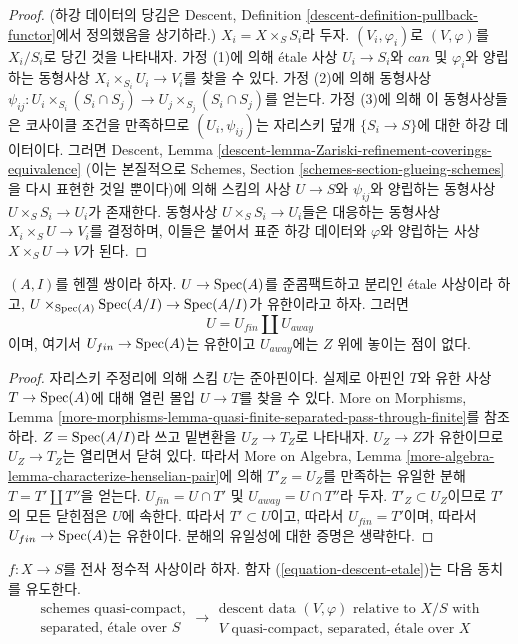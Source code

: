 \begin{proof}
(하강 데이터의 당김은 Descent, Definition
\ref{descent-definition-pullback-functor}에서 정의했음을 상기하라.)
$X_i = X \times_S S_i$라 두자. $(V_i, \varphi_i)$로
$(V, \varphi)$를 $X_i/S_i$로 당긴 것을 나타내자.
가정 (1)에 의해 \'etale 사상 $U_i \to S_i$와
$can$ 및 $\varphi_i$와 양립하는 동형사상
$X_i \times_{S_i} U_i \to V_i$를 찾을 수 있다.
가정 (2)에 의해 동형사상
$\psi_{ij} : U_i \times_{S_i} (S_i \cap S_j) \to
U_j \times_{S_j} (S_i \cap S_j)$를 얻는다.
가정 (3)에 의해 이 동형사상들은 코사이클 조건을 만족하므로
$(U_i, \psi_{ij})$는 자리스키 덮개 $\{S_i \to S\}$에 대한
하강 데이터이다. 그러면 Descent, Lemma
\ref{descent-lemma-Zariski-refinement-coverings-equivalence}
(이는 본질적으로 Schemes, Section
\ref{schemes-section-glueing-schemes}을 다시 표현한 것일 뿐이다)에 의해
스킴의 사상 $U \to S$와 $\psi_{ij}$와 양립하는 동형사상
$U \times_S S_i \to U_i$가 존재한다.
동형사상 $U \times_S S_i \to U_i$들은 대응하는 동형사상
$X_i \times_S U \to V_i$를 결정하며, 이들은 붙어서 표준 하강 데이터와
$\varphi$와 양립하는 사상 $X \times_S U \to V$가 된다.
\end{proof}

\begin{lemma}
\label{lemma-split-henselian}
$(A, I)$를 헨젤 쌍이라 하자. $U \to \mathop{\mathrm{Spec}}(A)$를 준콤팩트하고 분리인
\'etale 사상이라 하고,
$U \times_{\mathop{\mathrm{Spec}}(A)} \mathop{\mathrm{Spec}}(A/I) \to \mathop{\mathrm{Spec}}(A/I)$가 유한이라고 하자.
그러면
$$
U = U_{fin} \amalg U_{away}
$$
이며, 여기서 $U_{fin} \to \mathop{\mathrm{Spec}}(A)$는 유한이고
$U_{away}$에는 $Z$ 위에 놓이는 점이 없다.
\end{lemma}

\begin{proof}
자리스키 주정리에 의해 스킴 $U$는 준아핀이다.
실제로 아핀인 $T$와 유한 사상 $T \to \mathop{\mathrm{Spec}}(A)$에 대해
열린 몰입 $U \to T$를 찾을 수 있다. More on Morphisms, Lemma
\ref{more-morphisms-lemma-quasi-finite-separated-pass-through-finite}를
참조하라. $Z = \mathop{\mathrm{Spec}}(A/I)$라 쓰고 밑변환을 $U_Z \to T_Z$로 나타내자.
$U_Z \to Z$가 유한이므로 $U_Z \to T_Z$는 열리면서 닫혀 있다.
따라서 More on Algebra, Lemma
\ref{more-algebra-lemma-characterize-henselian-pair}에 의해
$T'_Z = U_Z$를 만족하는 유일한 분해 $T = T' \amalg T''$을 얻는다.
$U_{fin} = U \cap T'$ 및 $U_{away} = U \cap T''$라 두자.
$T'_Z \subset U_Z$이므로 $T'$의 모든 닫힌점은 $U$에 속한다.
따라서 $T' \subset U$이고, 따라서 $U_{fin} = T'$이며,
따라서 $U_{fin} \to \mathop{\mathrm{Spec}}(A)$는 유한이다.
분해의 유일성에 대한 증명은 생략한다.
\end{proof}

\begin{proposition}
\label{proposition-effective}
$f : X \to S$를 전사 정수적 사상이라 하자.
함자 (\ref{equation-descent-etale})는 다음 동치를 유도한다.
$$
\begin{matrix}
\text{schemes quasi-compact,}\\
\text{separated, \'etale over }S
\end{matrix}
\longrightarrow
\begin{matrix}
\text{descent data }(V, \varphi)\text{ relative to }X/S\text{ with}\\
V\text{ quasi-compact, separated, \'etale over }X
\end{matrix}
$$
\end{proposition}

